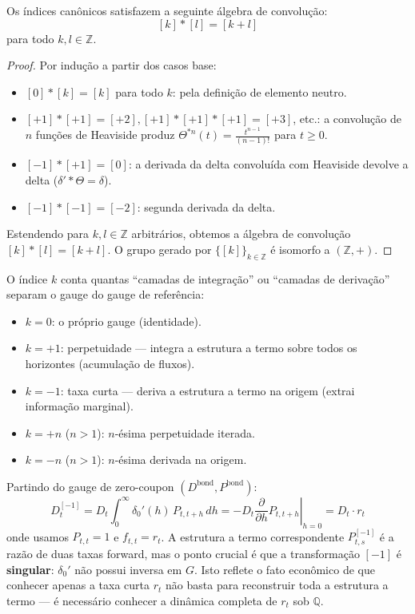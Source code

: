 \begin{prop}\label{prop:algebra_indices}
Os \'indices can\^onicos satisfazem a seguinte \'algebra de
convolu\c{c}\~ao:
\[
\boxed{[k] * [l] = [k + l]}
\]
para todo $k, l \in \mathbb{Z}$.
\end{prop}

\begin{proof}
Por indu\c{c}\~ao a partir dos casos base:
\begin{itemize}[nosep]
 \item $[0] * [k] = [k]$ para todo $k$: pela defini\c{c}\~ao de
 elemento neutro.
 \item $[+1] * [+1] = [+2], [+1] * [+1] * [+1] = [+3]$, etc.: a
 convolu\c{c}\~ao de $n$ fun\c{c}\~oes de Heaviside produz
 $\Theta^{*n}(t) = \frac{t^{n-1}}{(n-1)!}$ para $t \geq 0$.
 \item $[-1] * [+1] = [0]$: a derivada da delta convolu\'ida com
 Heaviside devolve a delta ($\delta' * \Theta = \delta$).
 \item $[-1] * [-1] = [-2]$: segunda derivada da delta.
\end{itemize}
Estendendo para $k,l \in \mathbb{Z}$ arbitr\'arios, obtemos a
\'algebra de convolu\c{c}\~ao $[k]*[l] = [k+l]$. O grupo gerado por
$\{[k]\}_{k \in \mathbb{Z}}$ \'e isomorfo a $(\mathbb{Z}, +)$.
\end{proof}

\begin{obs}
O \'indice $k$ conta quantas ``camadas de integra\c{c}\~ao'' ou
``camadas de deriva\c{c}\~ao'' separam o gauge do gauge de refer\^encia:
\begin{itemize}[nosep]
 \item $k = 0$: o pr\'oprio gauge (identidade).
 \item $k = +1$: perpetuidade --- integra a estrutura a termo sobre
 todos os horizontes (acumula\c{c}\~ao de fluxos).
 \item $k = -1$: taxa curta --- deriva a estrutura a termo na origem
 (extrai informa\c{c}\~ao marginal).
 \item $k = +n$ ($n > 1$): $n$-\'esima perpetuidade iterada.
 \item $k = -n$ ($n > 1$): $n$-\'esima derivada na origem.
\end{itemize}
\end{obs}

\begin{ex}
Partindo do gauge de zero-coupon $(D^{\text{bond}}, P^{\text{bond}})$:
\[
D_t^{[-1]} = D_t \int_0^\infty \delta_0'(h)\, P_{t,t+h}\,dh
 = -D_t \left.\frac{\partial}{\partial h}P_{t,t+h}\right|_{h=0}
 = D_t \cdot r_t
\]
onde usamos $P_{t,t} = 1$ e $f_{t,t} = r_t$. A estrutura a termo
correspondente $P_{t,s}^{[-1]}$ \'e a raz\~ao de duas taxas forward,
mas o ponto crucial \'e que a transforma\c{c}\~ao $[-1]$ \'e
\textbf{singular}: $\delta_0'$ n\~ao possui inversa em $G$. Isto
reflete o fato econ\^omico de que conhecer apenas a taxa curta $r_t$
n\~ao basta para reconstruir toda a estrutura a termo --- \'e
necess\'ario conhecer a din\^amica completa de $r_t$ sob $\mathbb{Q}$.
\end{ex}

